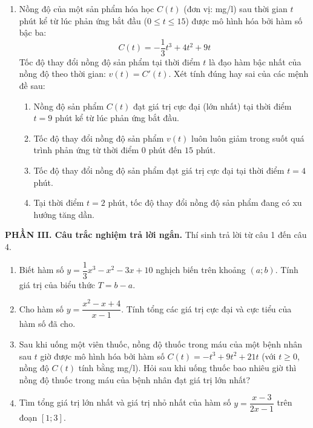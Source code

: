 \documentclass[12pt]{article}
\begin{document}
\begin{enumerate}[label=\textbf{Câu \arabic*.}, leftmargin=*]
		\vspace{4mm}
		\item Nồng độ của một sản phẩm hóa học $C(t)$ (đơn vị: mg/l) sau thời gian $t$ phút kể từ lúc phản ứng bắt đầu ($0 \le t \le 15$) được mô hình hóa bởi hàm số bậc ba:
		\[ C(t) = -\dfrac{1}{3}t^3 + 4t^2 + 9t \]
		Tốc độ thay đổi nồng độ sản phẩm tại thời điểm $t$ là đạo hàm bậc nhất của nồng độ theo thời gian: $v(t) = C'(t)$. Xét tính đúng hay sai của các mệnh đề sau:
		\begin{enumerate}[label=\alph*)]
			\item Nồng độ sản phẩm $C(t)$ đạt giá trị cực đại (lớn nhất) tại thời điểm $t = 9$ phút kể từ lúc phản ứng bắt đầu.
			\item Tốc độ thay đổi nồng độ sản phẩm $v(t)$ luôn luôn giảm trong suốt quá trình phản ứng từ thời điểm $0$ phút đến $15$ phút.
			\item Tốc độ thay đổi nồng độ sản phẩm đạt giá trị cực đại tại thời điểm $t = 4$ phút.
			\item Tại thời điểm $t = 2$ phút, tốc độ thay đổi nồng độ sản phẩm đang có xu hướng tăng dần.
		\end{enumerate}
		
	\end{enumerate}
	\vspace{4mm}
	\noindent\textbf{PHẦN III. Câu trắc nghiệm trả lời ngắn.} Thí sinh trả lời từ câu 1 đến câu 4.
	\vspace{2mm}
	
	\begin{enumerate}[label=\textbf{Câu \arabic*.}, leftmargin=*]
		
		\item Biết hàm số $y = \dfrac{1}{3}x^3 - x^2 - 3x + 10$ nghịch biến trên khoảng $(a; b)$. Tính giá trị của biểu thức $T = b - a$.
		
		\item Cho hàm số $y = \dfrac{x^2 - x + 4}{x - 1}$. Tính tổng các giá trị cực đại và cực tiểu của hàm số đã cho.
		
		\item Sau khi uống một viên thuốc, nồng độ thuốc trong máu của một bệnh nhân sau $t$ giờ được mô hình hóa bởi hàm số $C(t) = -t^3 + 9t^2 + 21t$ (với $t \ge 0$, nồng độ $C(t)$ tính bằng mg/l). Hỏi sau khi uống thuốc bao nhiêu giờ thì nồng độ thuốc trong máu của bệnh nhân đạt giá trị lớn nhất?
		
		\item Tìm tổng giá trị lớn nhất và giá trị nhỏ nhất của hàm số $y = \dfrac{x - 3}{2x - 1}$ trên đoạn $[1; 3]$.
		
	\end{enumerate}
	
\end{document}
